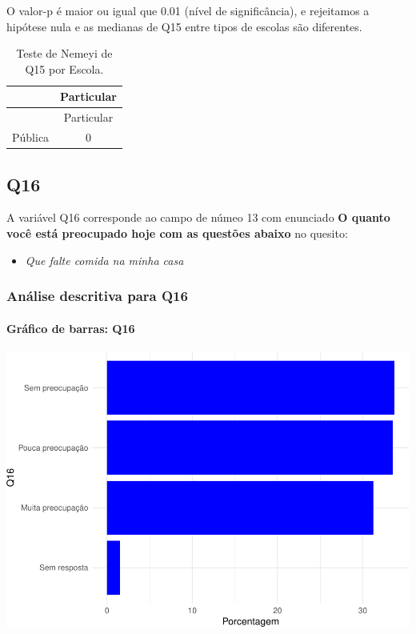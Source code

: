 \documentclass[]{article}
\providecommand{\tightlist}{%
  \setlength{\itemsep}{0pt}\setlength{\parskip}{0pt}}
\let\oldparagraph\paragraph
\renewcommand{\paragraph}[1]{\oldparagraph{#1}\mbox{}}
\begin{document}
O valor-p é maior ou igual que 0.01 (nível de significância), e rejeitamos a hipótese nula e as medianas de Q15 entre tipos de escolas são diferentes.

\begin{longtable}[]{@{}lc@{}}
\caption{\label{tab:unnamed-chunk-121}Teste de Nemeyi de Q15 por Escola.}\tabularnewline
\toprule
& Particular\tabularnewline
\midrule
\endfirsthead
\toprule
& Particular\tabularnewline
\midrule
\endhead
Pública & 0\tabularnewline
\bottomrule
\end{longtable}

\cleardoublepage

\hypertarget{q16}{%
\subsection{Q16}\label{q16}}

A variável Q16 corresponde ao campo de númeo 13 com enunciado \textbf{O quanto você está preocupado hoje com as questões abaixo} no quesito:

\begin{itemize}
\tightlist
\item
  \emph{Que falte comida na minha casa}
\end{itemize}

\hypertarget{anuxe1lise-descritiva-para-q16}{%
\subsubsection{Análise descritiva para Q16}\label{anuxe1lise-descritiva-para-q16}}

\hypertarget{gruxe1fico-de-barras-q16}{%
\paragraph{Gráfico de barras: Q16}\label{gruxe1fico-de-barras-q16}}

\begin{center}\includegraphics[width=0.75\linewidth]{relatorio_covid19_files/figure-latex/unnamed-chunk-128-1} \end{center}
\end{document}
